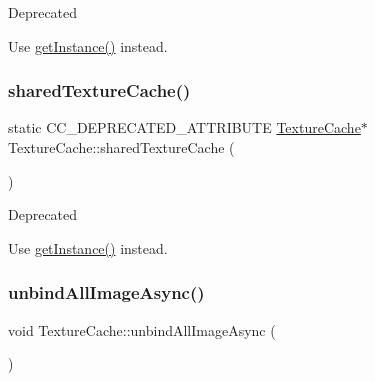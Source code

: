 \begin{DoxyRefDesc}{Deprecated}
\item[\hyperlink{deprecated__deprecated000135}{Deprecated}]Use \hyperlink{classTextureCache_aedd5e47ab3b453d894eab82ae18d80af}{get\+Instance()} instead. \end{DoxyRefDesc}
\mbox{\label{classTextureCache_ae5d28e68b30d4d9491db6ab0766eb25c}} 
\subsubsection{\texorpdfstring{shared\+Texture\+Cache()}{sharedTextureCache()}\hspace{0.1cm}{\footnotesize\ttfamily [2/2]}}
{\footnotesize\ttfamily static C\+C\+\_\+\+D\+E\+P\+R\+E\+C\+A\+T\+E\+D\+\_\+\+A\+T\+T\+R\+I\+B\+U\+TE \hyperlink{classTextureCache}{Texture\+Cache}$\ast$ Texture\+Cache\+::shared\+Texture\+Cache (\begin{DoxyParamCaption}{ }\end{DoxyParamCaption})\hspace{0.3cm}{\ttfamily [static]}}

\begin{DoxyRefDesc}{Deprecated}
\item[\hyperlink{deprecated__deprecated000368}{Deprecated}]Use \hyperlink{classTextureCache_aedd5e47ab3b453d894eab82ae18d80af}{get\+Instance()} instead. \end{DoxyRefDesc}
\mbox{\label{classTextureCache_a92d6cd0e772ecb99b2c140dba4205717}} 
\subsubsection{\texorpdfstring{unbind\+All\+Image\+Async()}{unbindAllImageAsync()}\hspace{0.1cm}{\footnotesize\ttfamily [1/2]}}
{\footnotesize\ttfamily void Texture\+Cache\+::unbind\+All\+Image\+Async (\begin{DoxyParamCaption}{ }\end{DoxyParamCaption})\hspace{0.3cm}{\ttfamily [virtual]}}

